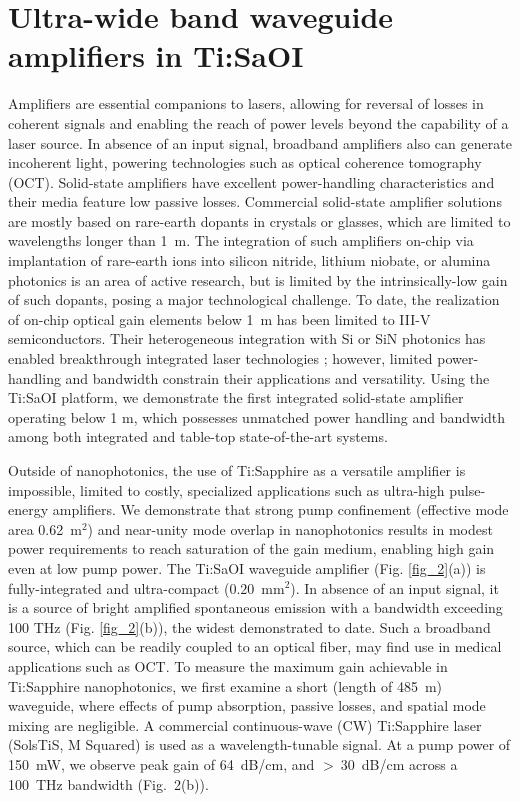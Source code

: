 \documentclass[amsmath, amsthm, amssymb, aps, prb, superscriptaddress, twocolumn, nofootinbib, 10pt]{revtex4-1}%
\begin{document}
\section{Ultra-wide band waveguide amplifiers in Ti:SaOI} 
Amplifiers are essential companions to lasers, allowing for reversal of losses in coherent signals and enabling the reach of power levels beyond the capability of a laser source. In absence of an input signal, broadband amplifiers also can generate incoherent light, powering technologies such as optical coherence tomography (OCT)\cite{bouma2022optical}. Solid-state amplifiers have excellent power-handling characteristics and their media feature low passive losses. Commercial solid-state amplifier solutions are mostly based on rare-earth dopants in crystals or glasses, which are limited to wavelengths longer than 1~\textmu m. The integration of such amplifiers on-chip via implantation of rare-earth ions into silicon nitride\cite{liu2022photonic}, lithium niobate\cite{jia2022integrated}, or alumina\cite{shtyrkova2019integrated} photonics is an area of active research, but is limited by the intrinsically-low gain of such dopants, posing a major technological challenge. To date, the realization of on-chip optical gain elements below 1~\textmu m has been limited to III-V semiconductors. Their heterogeneous integration with Si or SiN photonics has enabled breakthrough integrated laser technologies \cite{zhou2023prospects, tran2022extending, de2020heterogeneous, de2021iii, xiang2021laser}; however, limited power-handling and bandwidth constrain their applications and versatility. Using the Ti:SaOI platform, we demonstrate the first integrated solid-state amplifier operating below 1 \textmu m, which possesses unmatched power handling and bandwidth among both integrated and table-top state-of-the-art systems. 

Outside of nanophotonics, the use of Ti:Sapphire as a versatile amplifier is impossible, limited to costly, specialized applications such as ultra-high pulse-energy amplifiers. We demonstrate that strong pump confinement (effective mode area 0.62~\textmu m$^2$) and near-unity mode overlap in nanophotonics results in modest power requirements to reach saturation of the gain medium, enabling high gain even at low pump power. The Ti:SaOI waveguide amplifier (Fig. \ref{fig_2}(a)) is fully-integrated and ultra-compact ($0.20$~mm$^2$). In absence of an input signal, it is a source of bright amplified spontaneous emission with a bandwidth exceeding 100 THz (Fig. \ref{fig_2}(b)), the widest demonstrated to date. Such a broadband source, which can be readily coupled to an optical fiber, may find use in medical applications such as OCT\cite{drexler1999vivo, eggleston2019towards}. To measure the maximum gain achievable in Ti:Sapphire nanophotonics, we first examine a short (length of 485~\textmu m) waveguide, where effects of pump absorption, passive losses, and spatial mode mixing are negligible. A commercial continuous-wave (CW) Ti:Sapphire laser (SolsTiS, M Squared) is used as a wavelength-tunable signal. At a pump power of 150~mW, we observe peak gain of 64~dB/cm, and $>~30$~dB/cm across a 100~THz bandwidth (Fig.~2(b)). 
\end{document}
